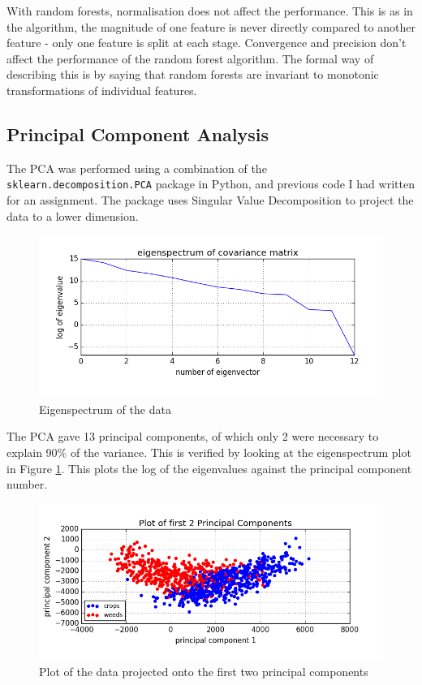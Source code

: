 \documentclass{scrartcl}
\begin{document}
With random forests, normalisation does not affect the performance. This is as in the algorithm, the magnitude of one feature is never directly compared to another feature - only one feature is split at each stage. Convergence and precision don't affect the performance of the random forest algorithm. The formal way of describing this is by saying that random forests are invariant to monotonic transformations of individual features.

\subsection{Principal Component Analysis}
The PCA was performed using a combination of the \texttt{sklearn.decomposition.PCA} package in Python, and previous code I had written for an assignment. The package uses Singular Value Decomposition to project the data to a lower dimension. \\

\begin{figure}[h]
\includegraphics[width=16cm]{eig.png}
\caption{Eigenspectrum of the data}
\label{fig:eig}
\end{figure}

The PCA gave 13 principal components, of which only 2 were necessary to explain 90\% of the variance. This is verified by looking at the eigenspectrum plot in Figure \ref{fig:eig}. This plots the log of the eigenvalues against the principal component number. \\

\begin{figure}[h]
\includegraphics[width=16cm]{2pc.png}
\caption{Plot of the data projected onto the first two principal components}
\label{fig:2pc}
\end{figure}
\end{document}
